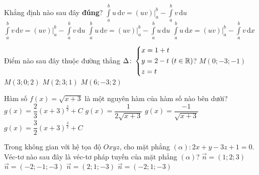 \begin{ex}%
	Khẳng định nào sau đây \textbf{đúng}?
	\choice
	{\True $\displaystyle\int\limits_a^b u\mathrm{\,d}v=\left(uv\right) \bigg|_
		a^b-\displaystyle\int\limits_a^b v\mathrm{\,d}u$}
	{$\displaystyle\int\limits_a^b v\mathrm{\,d}v=\left(uv\right) \bigg|_
		a^b-\displaystyle\int\limits_a^b v\mathrm{\,d}u$}
	{$\displaystyle\int\limits_a^b u\mathrm{\,d}v=\left(uv\right) \bigg|_
		a^b-\displaystyle\int\limits_a^b u\mathrm{\,d}u$}
	{$\displaystyle\int\limits_a^b u\mathrm{\,d}x=\left(uv\right) \bigg|_
		a^b-\displaystyle\int\limits_a^b v\mathrm{\,d}x$}
\end{ex}
\begin{ex}%
	Điểm nào sau đây thuộc đường thẳng $\Delta\colon \left\{\begin{aligned}&x=1+t\\&y=2-t\\&z=t\end{aligned}\right. (t\in \mathbb{R})$?
	\choice
	{$M\left(0;-3;-1\right)$}
	{\True $M\left(3;0;2\right)$}
	{$M\left(2;3;1\right)$}
	{$M\left(6;-3;2\right)$}
\end{ex}
\begin{ex}%
	Hàm số $f(x)=\sqrt{x+3}$ là một nguyên hàm của hàm số nào bên dưới?
	\choice
	{$g(x)=\dfrac{2}{3}\left(x+3\right)^{\frac{3}{2}}+C$}
	{\True $g(x)=\dfrac{1}{2\sqrt{x+3}}$}
	{$g(x)=\dfrac{-1}{\sqrt{x+3}}$}
	{$g(x)=\dfrac{3}{2}\left(x+3\right)^{\frac{3}{2}}+C$}
\end{ex}
\begin{ex}%
	Trong không gian với hệ tọa độ $Oxyz$, cho mặt phẳng $(\alpha)\colon 2x+y-3z+1=0$. Véc-tơ nào sau đây là véc-tơ pháp tuyến của mặt phẳng $(\alpha)$? 
	\choice
	{$\vec{n}=(1;2;3)$}
	{$\vec{n}=(-2;-1;-3)$}
	{\True $\vec{n}=(2;1;-3)$}
	{$\vec{n}=(-2;1;-3)$}
\end{ex}
